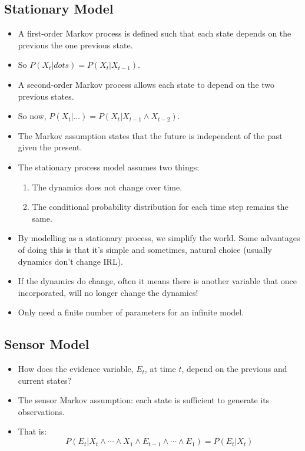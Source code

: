 \documentclass{article}
\begin{document}
\subsection{Stationary Model}
\begin{itemize}
    \item A first-order Markov process is defined such that each state depends on the previous the one previous state.
    \item So $P(X_t | dots) = P(X_t | X_{t-1})$.
    \item A second-order Markov process allows each state to depend on the two previous states.
    \item So now, $P(X_t | \dots) = P(X_t | X_{t - 1} \wedge X_{t - 2})$.
    \item The Markov assumption states that the future is independent of the past given the present.
    \item The stationary process model assumes two things:
        \begin{enumerate}
            \item The dynamics does not change over time.
            \item The conditional probability distribution for each time step remains the same.
        \end{enumerate}
    \item By modelling as a stationary process, we simplify the world.  Some advantages of doing this is that it's simple and sometimes, natural choice (usually dynamics don't change IRL).
    \item If the dynamics do change, often it means there is another variable that once incorporated, will no longer change the dynamics!
    \item Only need a finite number of parameters for an infinite model.
\end{itemize}

\subsection{Sensor Model}
\begin{itemize}
    \item How does the evidence variable, $E_t$, at time $t$, depend on the previous and current states?
    \item The sensor Markov assumption: each state is sufficient to generate its observations.
    \item That is:
        \[
            P(E_t | X_t \wedge \cdots \wedge X_1 \wedge E_{t-1} \wedge \cdots \wedge E_1) = P(E_t | X_t)
        \]
\end{itemize}
\end{document}

